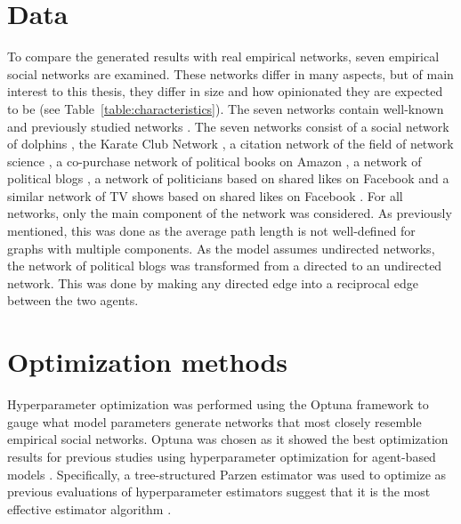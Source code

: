 \documentclass[11pt]{article}
\begin{document}
\section{Data}
To compare the generated results with real empirical networks, seven empirical social networks are examined. These networks differ in many aspects, but of main interest to this thesis, they differ in size and how opinionated they are expected to be (see Table~\ref{table:characteristics}). The seven networks contain well-known and previously studied networks \cite{rossi_network_2015}. The seven networks consist of a social network of dolphins \cite{lusseau_bottlenose_2003}, the Karate Club Network \cite{zachary_information_1977}, a citation network of the field of network science \cite{newman_finding_2006}, a co-purchase network of political books on Amazon \cite{shi_millions_2017}, a network of political blogs \cite{adamic_political_2005}, a network of politicians based on shared likes on Facebook and a similar network of TV shows based on shared likes on Facebook \cite{rozemberczki2019gemsec}. For all networks, only the main component of the network was considered. As previously mentioned, this was done as the average path length is not well-defined for graphs with multiple components. As the model assumes undirected networks, the network of political blogs was transformed from a directed to an undirected network. This was done by making any directed edge into a reciprocal edge between the two agents.

\section{Optimization methods}
Hyperparameter optimization was performed using the Optuna framework \cite{akiba_optuna_2019} to gauge what model parameters generate networks that most closely resemble empirical social networks. Optuna was chosen as it showed the best optimization results for previous studies using hyperparameter optimization for agent-based models \cite{kerr2021covasim}. Specifically, a tree-structured Parzen estimator was used to optimize as previous evaluations of hyperparameter estimators suggest that it is the most effective estimator algorithm \cite{akiba_optuna_2019, bergstra_algorithms_2011, hutter2014efficient}. 
\end{document}
